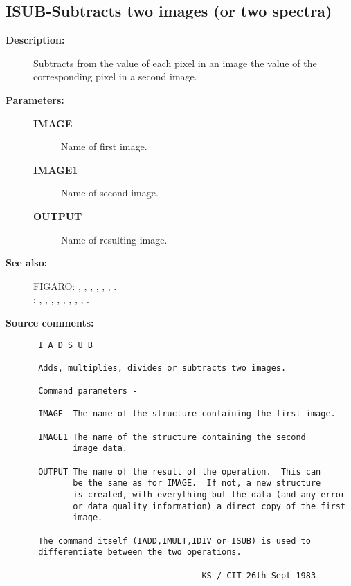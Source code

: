 \subsection{ISUB-\label{ISUB}Subtracts two images (or two spectra)}
\begin{description}

\item [{\bf Description:}]
 Subtracts from the value of each pixel in an image the
 value of the corresponding pixel in a second image.

\item [{\bf Parameters:}]
\begin{description}
\item [{\bf IMAGE}]
 Name of first image.
\item [{\bf IMAGE1}]
 Name of second image.
\item [{\bf OUTPUT}]
 Name of resulting image.
\end{description}

\item [{\bf See also:}]
FIGARO: , , , , , , .\\
: , , , , , , , , .\\

\item [{\bf Source comments:}]
\begin{verbatim}
 I A D S U B

 Adds, multiplies, divides or subtracts two images.

 Command parameters -

 IMAGE  The name of the structure containing the first image.

 IMAGE1 The name of the structure containing the second
        image data.

 OUTPUT The name of the result of the operation.  This can
        be the same as for IMAGE.  If not, a new structure
        is created, with everything but the data (and any error
        or data quality information) a direct copy of the first
        image.

 The command itself (IADD,IMULT,IDIV or ISUB) is used to
 differentiate between the two operations.

                                  KS / CIT 26th Sept 1983
\end{verbatim}
\end{description}

